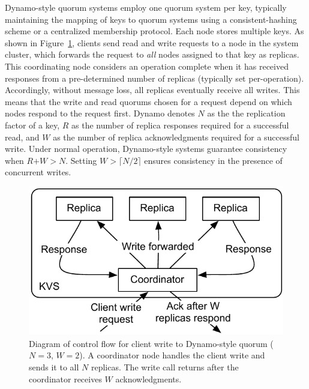 \documentclass{vldb}
\begin{document}
Dynamo-style quorum systems employ one quorum system per key,
typically maintaining the mapping of keys to quorum systems using a
consistent-hashing scheme or a centralized membership protocol. Each
node stores multiple keys.  As shown in
Figure~\ref{fig:dynamo-quorum}, clients send read and write requests
to a node in the system cluster, which forwards the request to
\textit{all} nodes assigned to that key as replicas.  This
coordinating node considers an operation complete when it has received
responses from a pre-determined number of replicas (typically set
per-operation).  Accordingly, without message loss, all replicas
eventually receive all writes.  This means that the write and read
quorums chosen for a request depend on which nodes respond to the
request first.  Dynamo denotes $N$ as the the replication factor of a
key, $R$ as the number of replica responses required for a successful
read, and $W$ as the number of replica acknowledgments required for a
successful write. Under normal operation, Dynamo-style systems
guarantee consistency when $R$$+$$W$$>$$N$.  Setting
$W$$>$$\lceil$$N/2$$\rceil$ ensures consistency in the presence of
concurrent writes.

\begin{figure}
\centering
\includegraphics[width=.85\columnwidth]{figs/dynamo-quorum.pdf}
\vspace{-8pt}
\caption{Diagram of control flow for client write to Dynamo-style
  quorum ($N=3$, $W=2$).  A coordinator node handles the client write
  and sends it to all $N$ replicas. The write call returns after the
  coordinator receives $W$ acknowledgments.}
\vspace{-12pt}
\label{fig:dynamo-quorum}
\end{figure}
\end{document}
